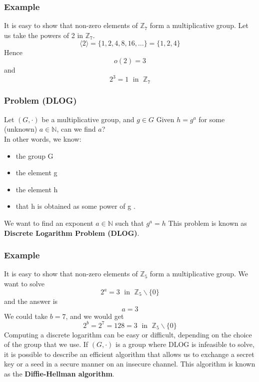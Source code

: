 \documentclass[a4paper, 10pt, titlepage]{article}
\begin{document}
\subsubsection*{Example}
It is easy to show that non-zero elements of $\mathbb{Z}_7$ form a multiplicative group.
Let us take the powers of 2 in $\mathbb{Z}_7$.
$$\langle 2 \rangle = \{1, 2, 4, 8, 16, \dots \} = \{1, 2, 4\}$$
Hence
$$o(2) = 3$$
and
$$2^3 = 1 \;\text{ in } \; \mathbb{Z}_7$$

\subsubsection*{Problem (DLOG)}
Let $(G, \cdot)$ be a multiplicative group, and $g \in G$
Given $h = g^a$ for some (unknown) $a \in \mathbb{N}$, can we find $a$? \\
In other words, we know:
\begin{itemize}
\item the group G
\item the element g
\item the element h
\item that h is obtained as some power of g .
\end{itemize}
We want to find an exponent $a \in \mathbb{N}$ such that $g^a = h$
This problem is known as \textbf{Discrete Logarithm Problem (DLOG)}.

\subsubsection*{Example}
It is easy to show that non-zero elements of $\mathbb{Z}_5$ form a multiplicative group. 
We want to solve
$$2^a = 3 \; \text{ in }\; \mathbb{Z}_5 \backslash \{0\}$$
and the answer is
$$a =3$$
We could take $b = 7$, and we would get
$$2^b = 2^7 = 128 = 3 \;\text{ in }\; \mathbb{Z}_5 \backslash \{0\}$$
Computing a discrete logarithm can be easy or difficult, depending on the choice of the group that we use.
If $(G , \cdot)$ is a group where DLOG is infeasible to solve, it is possible to describe an efficient algorithm that allows us to exchange a secret key or a seed in a secure manner on an insecure channel. This algorithm is known as the \textbf{Diffie-Hellman algorithm}.
\end{document}
